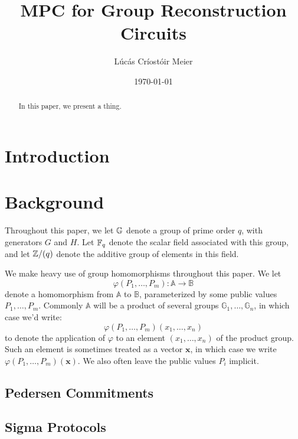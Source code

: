 

\date{\today}
\title{MPC for Group Reconstruction Circuits}
\author{Lúcás Críostóir Meier}



\maketitle

\begin{abstract}
    In this paper, we present a thing.
\end{abstract}

\section{Introduction}


\section{Background}

Throughout this paper, we let $\mathbb{G}$ denote a group of prime order $q$,
with generators $G$ and $H$. Let $\mathbb{F}_q$ denote the scalar field associated
with this group, and let $\mathbb{Z}/(q)$ denote the additive group of elements
in this field.

We make heavy use of group homomorphisms throughout this paper.
We let
$$
\varphi(P_1, \ldots, P_m) : \mathbb{A} \to \mathbb{B}
$$
denote a homomorphism from $\mathbb{A}$ to $\mathbb{B}$, parameterized
by some public values $P_1, \ldots, P_m$. Commonly $\mathbb{A}$
will be a product of several groups $\mathbb{G}_1, \ldots, \mathbb{G}_n$,
in which case we'd write:
$$
\varphi(P_1, \ldots, P_m)(x_1, \ldots, x_n)
$$
to denote the application of $\varphi$ to an element $(x_1, \ldots, x_n)$
of the product group.
Such an element is sometimes treated as a vector $\textbf{x}$, in which case
we write $\varphi(P_1, \ldots, P_m)(\textbf{x})$.
We also often leave the public values $P_i$ implicit.

\subsection{Pedersen Commitments}

\subsection{Sigma Protocols}

